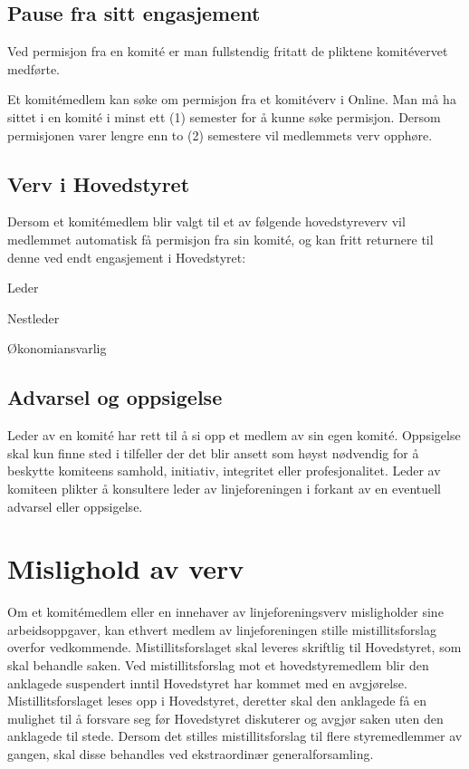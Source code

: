 \subsection{Pause fra sitt engasjement}{
Ved permisjon fra en komité er man fullstendig fritatt de pliktene komitévervet medførte.

Et komitémedlem kan søke om permisjon fra et komitéverv i Online. Man må ha sittet i en komité i minst ett (1) semester for å kunne søke permisjon. Dersom permisjonen varer lengre enn to (2) semestere vil medlemmets verv opphøre.
}

\subsection{Verv i Hovedstyret}{
Dersom et komitémedlem blir valgt til et av følgende hovedstyreverv vil medlemmet automatisk få permisjon fra sin komité, og kan fritt \linebreak returnere til denne ved endt engasjement i Hovedstyret:
\begin{liste}
	\item Leder
	\item Nestleder
	\item Økonomiansvarlig
\end{liste}
}

\subsection{Advarsel og oppsigelse}{
Leder av en komité har rett til å si opp et medlem av sin egen komité. Oppsigelse skal kun finne sted i tilfeller der det blir ansett som høyst nødvendig for å beskytte komiteens samhold, initiativ, integritet eller profesjonalitet. Leder av komiteen plikter å konsultere leder av linjeforeningen i forkant av en eventuell advarsel eller oppsigelse.
}

\section{Mislighold av verv}
\vspace{23pt}

Om et komitémedlem eller en innehaver av linjeforeningsverv misligholder sine arbeidsoppgaver, kan ethvert medlem av linjeforeningen stille mistillitsforslag overfor vedkommende. Mistillitsforslaget skal leveres skriftlig til Hovedstyret, som skal behandle saken. Ved mistillitsforslag mot et hovedstyremedlem blir den anklagede suspendert inntil Hovedstyret har kommet med en avgjørelse. Mistillitsforslaget leses opp i Hovedstyret, deretter skal den anklagede få en mulighet til å forsvare seg før Hovedstyret diskuterer og avgjør saken uten den anklagede til stede. Dersom det stilles mistillitsforslag til flere styremedlemmer av gangen, skal disse behandles ved ekstraordinær generalforsamling.


